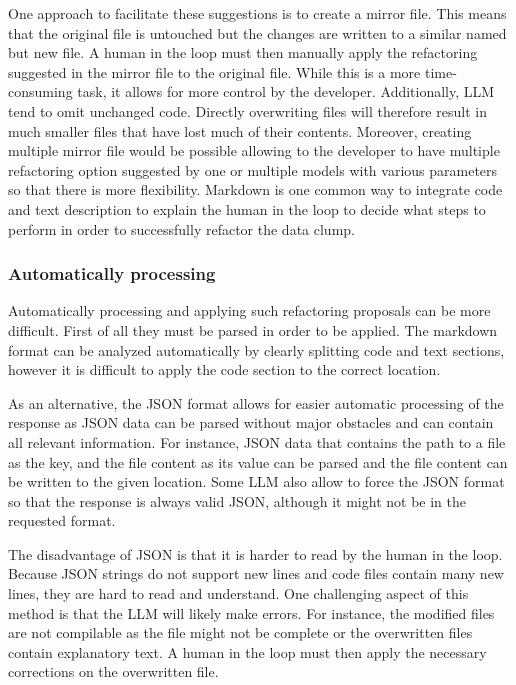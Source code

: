 One approach to facilitate these suggestions is to create a mirror file. This means that the original file is untouched but the changes are written to a similar named but new file. A human in the loop must then manually apply the refactoring suggested in the mirror file to the original file. While this is a more time-consuming task, it allows for more control by the developer. Additionally, \acs{LLM} tend to omit unchanged code. Directly overwriting files will therefore result in much smaller files that have lost much of their contents. Moreover, creating multiple mirror file would be possible allowing to the developer to have multiple refactoring option suggested by one or multiple models with various parameters so that there is more flexibility. 
Markdown is one common way to integrate code and text description to explain the human in the loop to decide what steps to perform in order to successfully refactor the data clump.  

\subsubsection{Automatically processing}

Automatically processing and applying such refactoring proposals can be more difficult.
First of all they must be parsed in order to be applied. The markdown format can be analyzed automatically by clearly splitting code and text sections, however it is difficult to apply the code section to the correct location. 

As an alternative, the \ac{JSON} format allows for easier automatic processing of the response as \ac{JSON} data can be parsed without major obstacles and can contain all relevant information. For instance, \ac{JSON} data that contains the path to a file as the key, and the file content as its value can be parsed and the file content can be written to the given location. Some \acs{LLM} also allow to force the \ac{JSON} format so that the response is always valid \ac{JSON}, although it might not be in the requested format. 

The disadvantage of \ac{JSON} is that it is harder to read by the human in the loop. Because JSON strings do not support new lines and code files contain many new lines, they are hard to read and understand.
One challenging aspect of this method is that the \ac{LLM} will likely make errors. For instance, the modified files are not compilable as the file might not be complete or the  overwritten files contain explanatory text. A human in the loop must then apply the necessary corrections on the overwritten file.



